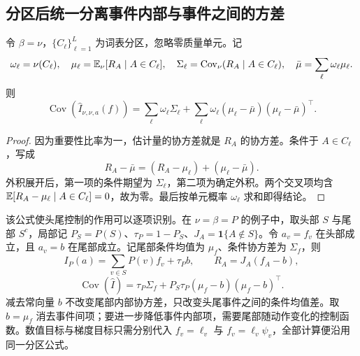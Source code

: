 \subsection{分区后统一分离事件内部与事件之间的方差}

\begin{theorem}
\label{est:thm:kl-master-partition}
令 $\beta=\nu$，$\{C_\ell\}_{\ell=1}^L$ 为词表分区，忽略零质量单元。记
\begin{equation*}
 \omega_\ell=\nu(C_\ell),\quad
 \mu_\ell=\mathbb E_\nu[R_A\mid A\in C_\ell],\quad
 \Sigma_\ell=\operatorname{Cov}_\nu(R_A\mid A\in C_\ell),\quad
 \bar\mu=\sum_\ell\omega_\ell\mu_\ell.
\end{equation*}
则
\begin{equation}
 \operatorname{Cov}(\widehat I_{\nu,\nu,a}(f))
 =\sum_\ell\omega_\ell\Sigma_\ell
  +\sum_\ell\omega_\ell(\mu_\ell-\bar\mu)(\mu_\ell-\bar\mu)^\top.
 \label{est:eq:kl-master-partition}
\end{equation}
\end{theorem}

\begin{proof}
因为重要性比率为一，估计量的协方差就是 $R_A$ 的协方差。条件于 $A\in C_\ell$，写成
\begin{equation*}
 R_A-\bar\mu=(R_A-\mu_\ell)+(\mu_\ell-\bar\mu).
\end{equation*}
外积展开后，第一项的条件期望为 $\Sigma_\ell$，第二项为确定外积。两个交叉项均含 $\mathbb E[R_A-\mu_\ell\mid A\in C_\ell]=0$，故为零。最后按单元概率 $\omega_\ell$ 求和即得结论。
\end{proof}

该公式使头尾控制的作用可以逐项识别。在 $\nu=\beta=P$ 的例子中，取头部 $S$ 与尾部 $S^c$，局部记 $P_S=P(S)$、$\tau_P=1-P_S$、$J_A=\mathbf1\{A\notin S\}$。令 $a_v=f_v$ 在头部成立，且 $a_v=b$ 在尾部成立。记尾部条件均值为 $\mu_f$、条件协方差为 $\Sigma_f$，则
\begin{equation*}
 I_P(a)=\sum_{v\in S}P(v)f_v+\tau_Pb,\qquad
 R_A=J_A(f_A-b),
\end{equation*}
\begin{equation}
 \operatorname{Cov}(\widehat I)
 =\tau_P\Sigma_f+P_S\tau_P(\mu_f-b)(\mu_f-b)^\top.
 \label{est:eq:kl-master-head-tail}
\end{equation}
减去常向量 $b$ 不改变尾部内部协方差，只改变头尾事件之间的条件均值差。取 $b=\mu_f$ 消去事件间项；要进一步降低事件内部项，需要尾部随动作变化的控制函数。数值目标与梯度目标只需分别代入 $f_v=\ell_v$ 与 $f_v=\ell_v\psi_v$，全部计算便沿用同一分区公式。

